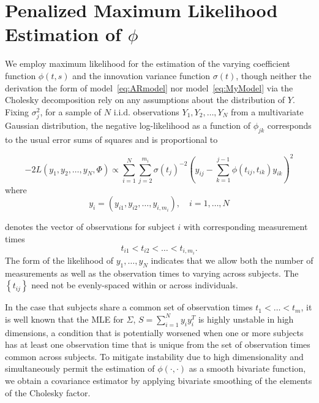 \documentclass[12pt]{article}
\theoremstyle{definition}
\begin{document}
\section{Penalized Maximum Likelihood Estimation of $\phi$}

We employ maximum likelihood  for the estimation of  the varying coefficient function $\phi\left(t,s\right)$ and the innovation variance function $\sigma\left(t\right)$, though neither the derivation the form of model~\ref{eq:ARmodel} nor model~\ref{eq:MyModel} via the Cholesky decomposition rely on any assumptions about the distribution of $Y$. Fixing $\sigma_j^2$,  for a sample of $N$  i.i.d. observations $Y_1,Y_2,\dots,Y_N$ from a multivariate Gaussian distribution, the negative log-likelihood as a function of $\phi_{jk}$ corresponds to the usual error sums of squares and is proportional to

\begin{equation}
-2 L\left(y_1, y_2, \dots,y_N ,\Phi \right) \propto \sum_{i=1}^N \sum_{j=2}^{m_i} \sigma\left({t_j}\right)^{-2} \left(y_{ij} - \sum_{k=1}^{j-1}\phi\left({t_{ij},t_{ik}}\right)y_{ik} \right)^2 \label{loglikelihood}
\end{equation}
\noindent
where 
\[
y_i = \left( y_{i1}, y_{i2}, \dots, y_{i,m_i}\right), \quad i=1,\dots,N 
\] 

\noindent
denotes the vector of observations for subject $i$ with corresponding measurement times 
\[
t_{i1} < t_{i2} < \dots < t_{i,m_i}.
\]
The form of the likelihood of $y_1,\dots,y_N$ indicates that we allow both the number of measurements as well as the observation times to varying across subjects. The $\left\{t_{ij} \right\}$ need not be evenly-spaced within or across individuals.  

In the case that subjects share a common set of observation times $t_1 < \dots < t_m$,  it is well known that the MLE for $\Sigma$, $S = \sum_{i=1}^N y_i y_i^T$ is highly unstable in high dimensions, a condition that is potentially worsened when one or more subjects has at least one observation time that is unique from the set of observation times common across subjects. To mitigate instability due to high dimensionality and simultaneously permit the estimation of $\phi\left(\cdot,\cdot\right)$ as a smooth bivariate function, we obtain a covariance estimator by applying bivariate smoothing of the elements of the Cholesky factor. 
\end{document}
